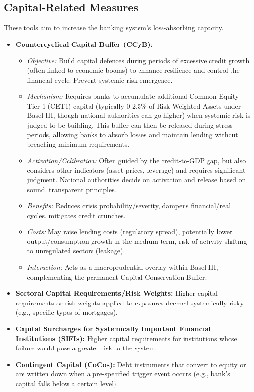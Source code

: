 \subsection{Capital-Related Measures}
These tools aim to increase the banking system's loss-absorbing capacity.
\begin{itemize}
    \item \textbf{Countercyclical Capital Buffer (CCyB):}
        \begin{itemize}
            \item \textit{Objective:} Build capital defences during periods of excessive credit growth (often linked to economic booms) to enhance resilience and control the financial cycle. Prevent systemic risk emergence.
            \item \textit{Mechanism:} Requires banks to accumulate additional Common Equity Tier 1 (CET1) capital (typically 0-2.5\% of Risk-Weighted Assets under Basel III, though national authorities can go higher) when systemic risk is judged to be building. This buffer can then be released during stress periods, allowing banks to absorb losses and maintain lending without breaching minimum requirements.
            \item \textit{Activation/Calibration:} Often guided by the credit-to-GDP gap, but also considers other indicators (asset prices, leverage) and requires significant judgment. National authorities decide on activation and release based on sound, transparent principles.
            \item \textit{Benefits:} Reduces crisis probability/severity, dampens financial/real cycles, mitigates credit crunches.
            \item \textit{Costs:} May raise lending costs (regulatory spread), potentially lower output/consumption growth in the medium term, risk of activity shifting to unregulated sectors (leakage).
            \item \textit{Interaction:} Acts as a macroprudential overlay within Basel III, complementing the permanent Capital Conservation Buffer.
        \end{itemize}
    \item \textbf{Sectoral Capital Requirements/Risk Weights:} Higher capital requirements or risk weights applied to exposures deemed systemically risky (e.g., specific types of mortgages).
    \item \textbf{Capital Surcharges for Systemically Important Financial Institutions (SIFIs):} Higher capital requirements for institutions whose failure would pose a greater risk to the system.
    \item \textbf{Contingent Capital (CoCos):} Debt instruments that convert to equity or are written down when a pre-specified trigger event occurs (e.g., bank's capital falls below a certain level).
\end{itemize}

